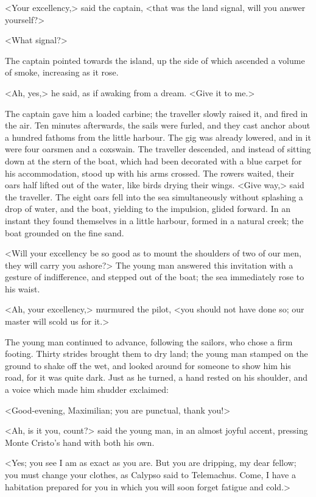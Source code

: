  <Your excellency,> said the captain, <that was the land signal, will you answer yourself?> 

 <What signal?> 

 The captain pointed towards the island, up the side of which ascended a volume of smoke, increasing as it rose. 

 <Ah, yes,> he said, as if awaking from a dream. <Give it to me.> 

 The captain gave him a loaded carbine; the traveller slowly raised it, and fired in the air. Ten minutes afterwards, the sails were furled, and they cast anchor about a hundred fathoms from the little harbour. The gig was already lowered, and in it were four oarsmen and a coxswain. The traveller descended, and instead of sitting down at the stern of the boat, which had been decorated with a blue carpet for his accommodation, stood up with his arms crossed. The rowers waited, their oars half lifted out of the water, like birds drying their wings.  <Give way,> said the traveller. The eight oars fell into the sea simultaneously without splashing a drop of water, and the boat, yielding to the impulsion, glided forward. In an instant they found themselves in a little harbour, formed in a natural creek; the boat grounded on the fine sand. 

 <Will your excellency be so good as to mount the shoulders of two of our men, they will carry you ashore?> The young man answered this invitation with a gesture of indifference, and stepped out of the boat; the sea immediately rose to his waist. 

 <Ah, your excellency,> murmured the pilot, <you should not have done so; our master will scold us for it.> 

 The young man continued to advance, following the sailors, who chose a firm footing. Thirty strides brought them to dry land; the young man stamped on the ground to shake off the wet, and looked around for someone to show him his road, for it was quite dark. Just as he turned, a hand rested on his shoulder, and a voice which made him shudder exclaimed: 

 <Good-evening, Maximilian; you are punctual, thank you!> 

 <Ah, is it you, count?> said the young man, in an almost joyful accent, pressing Monte Cristo's hand with both his own. 

 <Yes; you see I am as exact as you are. But you are dripping, my dear fellow; you must change your clothes, as Calypso said to Telemachus. Come, I have a habitation prepared for you in which you will soon forget fatigue and cold.> 

